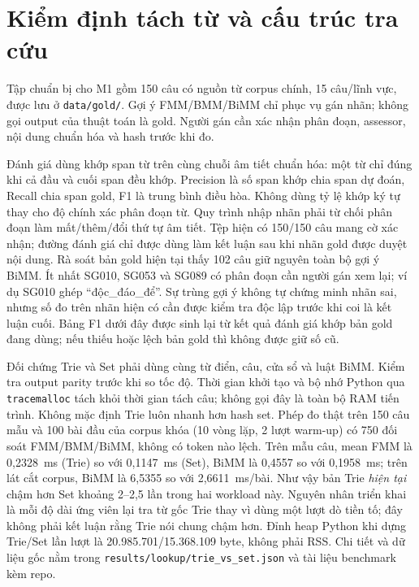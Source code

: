 \section{Kiểm định tách từ và cấu trúc tra cứu}

Tập chuẩn bị cho M1 gồm 150 câu có nguồn từ corpus chính, 15 câu/lĩnh vực,
được lưu ở \texttt{data/gold/}. Gợi ý FMM/BMM/BiMM chỉ phục vụ gán nhãn;
không gọi output của thuật toán là gold. Người gán cần xác nhận phân đoạn,
assessor, nội dung chuẩn hóa và hash trước khi đo.

Đánh giá dùng khớp span từ trên cùng chuỗi âm tiết chuẩn hóa: một từ chỉ đúng
khi cả đầu và cuối span đều khớp. Precision là số span khớp chia span dự đoán,
Recall chia span gold, F1 là trung bình điều hòa. Không dùng tỷ lệ khớp ký tự
thay cho độ chính xác phân đoạn từ. Quy trình nhập nhãn phải từ chối phân đoạn
làm mất/thêm/đổi thứ tự âm tiết. Tệp hiện có 150/150 câu mang cờ xác nhận;
đường đánh giá chỉ được dùng làm kết luận sau khi nhãn gold được duyệt nội dung.
Rà soát bản gold hiện tại thấy 102 câu giữ nguyên toàn bộ gợi ý BiMM. Ít nhất
SG010, SG053 và SG089 có phân đoạn cần người gán xem lại; ví dụ SG010 ghép
``độc\_đáo\_để''. Sự trùng gợi ý không tự chứng minh nhãn sai,
nhưng số đo trên nhãn hiện có cần được kiểm tra độc lập trước khi coi là kết luận
cuối. Bảng F1 dưới đây được sinh lại từ kết quả đánh giá khớp bản gold đang dùng;
nếu thiếu hoặc lệch bản gold thì không được giữ số cũ.

Đối chứng Trie và Set phải dùng cùng từ điển, câu, cửa sổ và luật BiMM. Kiểm tra
output parity trước khi so tốc độ. Thời gian khởi tạo và bộ nhớ Python qua
\texttt{tracemalloc} tách khỏi thời gian tách câu; không gọi đây là toàn bộ RAM
tiến trình. Không mặc định Trie luôn nhanh hơn hash set.
Phép đo thật trên 150 câu mẫu và 100 bài đầu của corpus khóa (10 vòng lặp,
2 lượt warm-up) có 750 đối soát FMM/BMM/BiMM, không có token nào lệch.
Trên mẫu câu, mean FMM là 0,2328~ms (Trie) so với 0,1147~ms (Set), BiMM là
0,4557 so với 0,1958~ms; trên lát cắt corpus, BiMM là 6,5355 so với
2,6611~ms/bài. Như vậy bản Trie \emph{hiện tại} chậm hơn Set khoảng 2--2,5
lần trong hai workload này. Nguyên nhân triển khai là mỗi độ dài ứng viên lại
tra từ gốc Trie thay vì dùng một lượt dò tiền tố; đây không phải kết luận rằng
Trie nói chung chậm hơn. Đỉnh heap Python khi dựng Trie/Set lần lượt là
20.985.701/15.368.109 byte, không phải RSS. Chi tiết và dữ liệu gốc nằm trong
\texttt{results/lookup/trie\_vs\_set.json} và tài liệu benchmark kèm repo.

